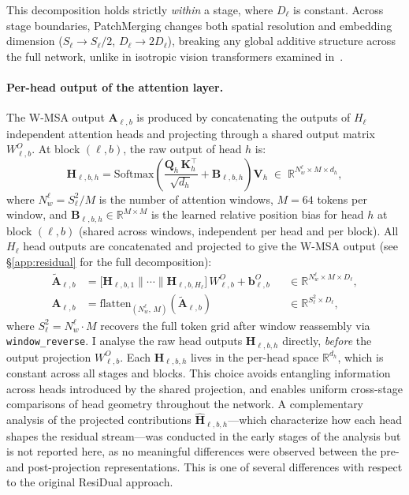 This decomposition holds strictly \emph{within} a stage, where $D_\ell$ is
constant. Across stage boundaries, PatchMerging changes both spatial
resolution and embedding dimension ($S_\ell \to S_\ell/2$,
$D_\ell \to 2D_\ell$), breaking any global additive structure across the
full network, unlike in isotropic vision transformers examined in~\cite{residual2024}.

\paragraph{Per-head output of the attention layer.}
The W-MSA output $\mathbf{A}_{\ell,b}$ is produced by concatenating the
outputs of $H_\ell$ independent attention heads and projecting through a
shared output matrix $W^O_{\ell,b}$. At block $(\ell, b)$, the raw output
of head $h$ is:
\begin{equation}
    \mathbf{H}_{\ell,b,h}
    = \mathrm{Softmax}\!\left(
        \frac{\mathbf{Q}_h\,\mathbf{K}_h^\top}{\sqrt{d_h}}
        + \mathbf{B}_{\ell,b,h}
      \right)\mathbf{V}_h
    \;\in\; \mathbb{R}^{N_w^\ell \times M \times d_h},
    \label{eq:raw_head}
\end{equation}
where $N_w^\ell = S_\ell^2/M$ is the number of attention windows, $M=64$
tokens per window, and $\mathbf{B}_{\ell,b,h} \in \mathbb{R}^{M\times M}$
is the learned relative position bias for head $h$ at block $(\ell,b)$
(shared across windows, independent per head and per block).
All $H_\ell$ head outputs are concatenated and projected to give the W-MSA
output (see \S\ref{app:residual} for the full decomposition):
\begin{align}
    \widetilde{\mathbf{A}}_{\ell,b}
    &= \bigl[\mathbf{H}_{\ell,b,1} \|\cdots\| \mathbf{H}_{\ell,b,H_\ell}\bigr]
       \,W^O_{\ell,b} + \mathbf{b}^O_{\ell,b}
    &&\in \mathbb{R}^{N_w^\ell \times M \times D_\ell}, \label{eq:wmsa_proj} \\
    \mathbf{A}_{\ell,b}
    &= \mathrm{flatten}_{(N_w^\ell,\, M)}\!\left(\widetilde{\mathbf{A}}_{\ell,b}\right)
    &&\in \mathbb{R}^{S_\ell^2 \times D_\ell},
    \label{eq:wmsa_out}
\end{align}
where $S_\ell^2 = N_w^\ell \cdot M$ recovers the full token grid after
window reassembly via \texttt{window\_reverse}.
I analyse the raw head outputs $\mathbf{H}_{\ell,b,h}$ directly,
\emph{before} the output projection $W^O_{\ell,b}$. Each
$\mathbf{H}_{\ell,b,h}$ lives in the per-head space $\mathbb{R}^{d_h}$,
which is constant across all stages and blocks. This choice avoids
entangling information across heads introduced by the shared projection, and
enables uniform cross-stage comparisons of head geometry throughout the
network. A complementary analysis of the projected contributions
$\widehat{\mathbf{H}}_{\ell,b,h}$—which characterize how each head shapes 
the residual stream—was conducted in the early stages of the analysis but 
is not reported here, as no meaningful differences were observed between 
the pre- and post-projection representations. This is one of several 
differences with respect to the original ResiDual approach.

